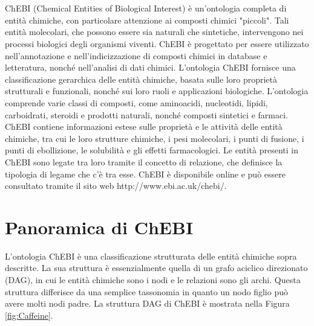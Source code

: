 \documentclass[12pt,a4paper,openright,twoside]{book}
\begin{document}
\frontmatter



\tableofcontents

\mainmatter

\chapter{\introductionname}
\label{chap:introduction}

ChEBI (Chemical Entities of Biological Interest) è un'ontologia completa di entità chimiche, con particolare attenzione ai composti chimici "piccoli". Tali entità molecolari, che possono essere
sia naturali che sintetiche, intervengono nei processi biologici degli organismi viventi. ChEBI è progettato per essere utilizzato nell'annotazione e nell'indicizzazione di composti chimici in database e letteratura, nonché nell'analisi di dati chimici.
L'ontologia ChEBI fornisce una classificazione gerarchica delle entità chimiche, basata sulle loro proprietà strutturali e funzionali, nonché sui loro ruoli e applicazioni biologiche. L'ontologia comprende varie classi di composti, come aminoacidi, nucleotidi, lipidi, carboidrati, steroidi e prodotti naturali, nonché composti sintetici e farmaci.
ChEBI contiene informazioni estese sulle proprietà e le attività delle entità chimiche, tra cui le loro strutture chimiche, i pesi molecolari, i punti di fusione, i punti di ebollizione, le solubilità e gli effetti farmacologici.
Le entità presenti in ChEBI sono legate tra loro tramite il concetto di relazione, che definisce la tipologia di legame che c'è tra esse.
ChEBI è disponibile online e può essere consultato tramite il sito web http://www.ebi.ac.uk/chebi/.

\chapter{Panoramica di ChEBI}
\label{chap:panoramica}
L'ontologia ChEBI è una classificazione strutturata delle entità chimiche sopra descritte. La sua struttura è essenzialmente quella di un grafo aciclico direzionato (DAG), in cui le entità chimiche sono i nodi e le relazioni sono gli archi.
Questa struttura differisce da una semplice tassonomia in quanto un nodo figlio può avere molti nodi padre.
La struttura DAG di ChEBI è mostrata nella Figura \ref{fig:Caffeine}.
\end{document}
